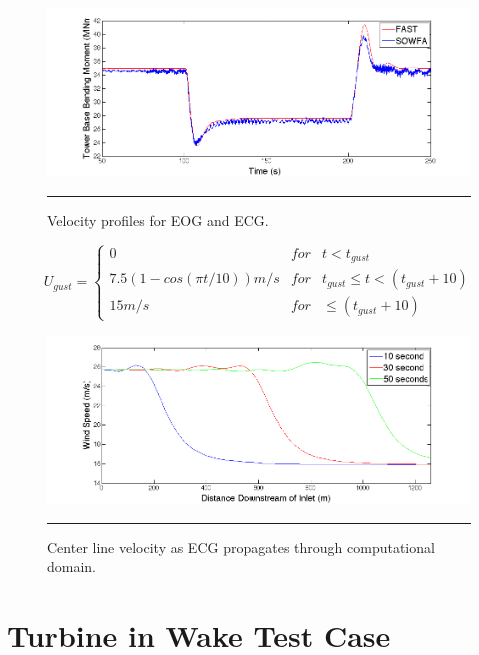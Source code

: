 \begin{figure}[htbp]
	\centering
		\includegraphics[trim = {1cm 0 2cm 0}, clip, width = \linewidth]{Figures/ch6Figures/fig6-6.png}
		\rule{35em}{0.5pt}
	\caption{Velocity profiles for EOG and ECG.}
	\label{fig6-7}
\end{figure}

\begin{equation}
	U_{gust}=\left\{\begin{matrix}
0 & for  & t<t_{gust}\\ 
 7.5(1-cos(\pi t/10)) m/s & for  & t_{gust} \leq t<(t_{gust}+10)\\ 
 15 m/s &  for & \leq (t_{gust} +10)
\end{matrix}\right. \label{eq6-1}
\end{equation}

\begin{figure}[htbp]
	\centering
		\includegraphics[trim = {1cm 0 2cm 0}, clip, width = \linewidth]{Figures/ch6Figures/fig6-8.png}
		\rule{35em}{0.5pt}
	\caption{Center line velocity as ECG propagates through computational domain.}
	\label{fig6-8}
\end{figure}




\section{Turbine in Wake Test Case} \label{section6-6}

